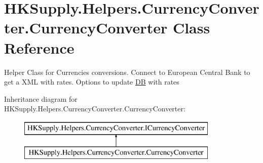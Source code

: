 \hypertarget{class_h_k_supply_1_1_helpers_1_1_currency_converter_1_1_currency_converter}{}\section{H\+K\+Supply.\+Helpers.\+Currency\+Converter.\+Currency\+Converter Class Reference}
\label{class_h_k_supply_1_1_helpers_1_1_currency_converter_1_1_currency_converter}


Helper Class for Currencies conversions. Connect to European Central Bank to get a X\+ML with rates. Options to update \mbox{\hyperlink{namespace_h_k_supply_1_1_d_b}{DB}} with rates  


Inheritance diagram for H\+K\+Supply.\+Helpers.\+Currency\+Converter.\+Currency\+Converter\+:\begin{figure}[H]
\begin{center}
\leavevmode
\includegraphics[height=2.000000cm]{class_h_k_supply_1_1_helpers_1_1_currency_converter_1_1_currency_converter}
\end{center}
\end{figure}
